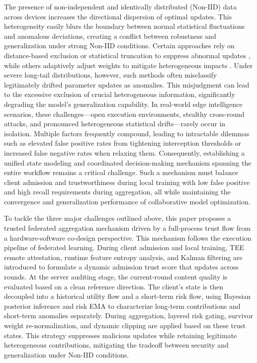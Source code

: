 \documentclass[final,5p,times,twocolumn]{elsarticle/elsarticle}
\begin{document}
The presence of non-independent and identically distributed (Non-IID) data across devices increases the directional dispersion of optimal updates. This heterogeneity easily blurs the boundary between normal statistical fluctuations and anomalous deviations, creating a conflict between robustness and generalization under strong Non-IID conditions. Certain approaches rely on distance-based exclusion or statistical truncation to suppress abnormal updates \cite{blanchard2017krum,yin2018byzantine}, while others adaptively adjust weights to mitigate heterogeneous impacts \cite{wang2025rasa}. Under severe long-tail distributions, however, such methods often misclassify legitimately drifted parameter updates as anomalies. This misjudgment can lead to the excessive exclusion of crucial heterogeneous information, significantly degrading the model's generalization capability. In real-world edge intelligence scenarios, these challenges---open execution environments, stealthy cross-round attacks, and pronounced heterogeneous statistical drifts---rarely occur in isolation. Multiple factors frequently compound, leading to intractable dilemmas such as elevated false positive rates from tightening interception thresholds or increased false negative rates when relaxing them. Consequently, establishing a unified state modeling and coordinated decision-making mechanism spanning the entire workflow remains a critical challenge. Such a mechanism must balance client admission and trustworthiness during local training with low false positive and high recall requirements during aggregation, all while maintaining the convergence and generalization performance of collaborative model optimization.

To tackle the three major challenges outlined above, this paper proposes a trusted federated aggregation mechanism driven by a full-process trust flow from a hardware-software co-design perspective. This mechanism follows the execution pipeline of federated learning. During client admission and local training, TEE remote attestation, runtime feature entropy analysis, and Kalman filtering are introduced to formulate a dynamic admission trust score that updates across rounds. At the server auditing stage, the current-round content quality is evaluated based on a clean reference direction. The client's state is then decoupled into a historical utility flow and a short-term risk flow, using Bayesian posterior inference and risk EMA to characterize long-term contributions and short-term anomalies separately. During aggregation, layered risk gating, survivor weight re-normalization, and dynamic clipping are applied based on these trust states. This strategy suppresses malicious updates while retaining legitimate heterogeneous contributions, mitigating the tradeoff between security and generalization under Non-IID conditions.
\end{document}
